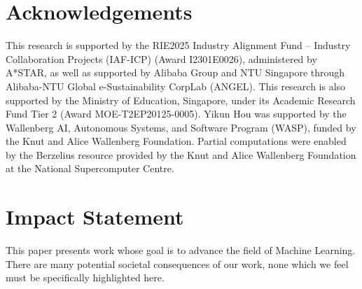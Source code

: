 \documentclass{article}
\begin{document}
\section*{Acknowledgements}
This research is supported by the RIE2025 Industry Alignment Fund –
Industry Collaboration Projects (IAF-ICP) (Award I2301E0026), administered by A*STAR, as well
as supported by Alibaba Group and NTU Singapore through Alibaba-NTU Global e-Sustainability
CorpLab (ANGEL). 
This research is also supported by the Ministry of Education, Singapore, under its Academic Research Fund Tier 2 (Award MOE-T2EP20125-0005).
Yikun Hou was supported by the Wallenberg AI, Autonomous Systems, and Software Program (WASP), funded by the Knut and Alice Wallenberg Foundation. Partial computations were enabled by the Berzelius resource provided by the Knut and Alice Wallenberg Foundation at the National Supercomputer Centre.

\section*{Impact Statement}

This paper presents work whose goal is to advance the field of Machine Learning. There are many potential societal consequences of our work, none which we feel must be specifically highlighted here.

\clearpage
%



\clearpage
\appendix

\end{document}
